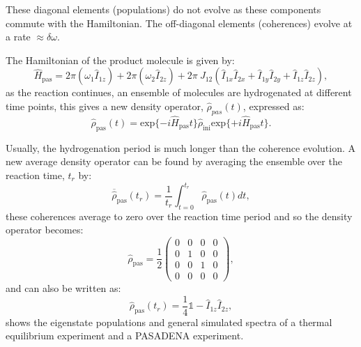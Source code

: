  These diagonal elements (populations) do not evolve as these components commute with the Hamiltonian. The off-diagonal
 elements (coherences) evolve at a rate $\approx\delta{\omega}$.

The Hamiltonian of the product molecule is given by:
\begin{equation}
  \hat{H}_{\text{pas}} = 2\pi(\omega_1\hat{I}_{1z}) + 2\pi(\omega_2\hat{I}_{2z}) + 2\pi~J_{12}(\hat{I}_{1x}\hat{I}_{2x} + \hat{I}_{1y}\hat{I}_{2y} + \hat{I}_{1z}\hat{I}_{2z}),
\end{equation}
 as the reaction continues, an ensemble of molecules are hydrogenated at different time points, this gives
 a new density operator, $\hat{\rho}_{pas}(t)$, expressed as:
 \begin{equation}
   \hat{\rho}_{\text{pas}}(t) = \text{exp}\{-i\hat{H}_{\text{pas}}t\}\hat{\rho}_{\text{ini}}\text{exp}\{+i\hat{H}_{\text{pas}}t\}.
 \end{equation}

Usually, the hydrogenation period is much longer than the coherence evolution. A new average density operator
can be found by averaging the ensemble over the reaction time, $t_r$ by:
\begin{equation}
  \overbar{\hat{\rho}}_{\text{pas}}(t_r) = \frac{1}{t_r}\int_{t=0}^{t_r}\hat{\rho}_{\text{pas}}(t)dt,
\end{equation}
these coherences average to zero over the reaction time period and so the
 density operator becomes:
 \begin{equation}
   \hat{\rho}_{\text{pas}} = \frac{1}{2}\begin{pmatrix}
   0 & 0 & 0 & 0\\
   0 & 1 & 0 & 0\\
   0 & 0 & 1 & 0\\
   0 & 0 & 0 & 0
 \end{pmatrix},
 \end{equation}
and can also be written as:
\begin{equation}
   \hat{\rho}_{\text{pas}}(t_r) = \frac{1}{4}\mathbb{1} - \hat{I}_{1z}\hat{I}_{2z},
\end{equation}
  shows the eigenstate populations and general simulated spectra of a thermal equilibrium experiment and
 a PASADENA experiment.

